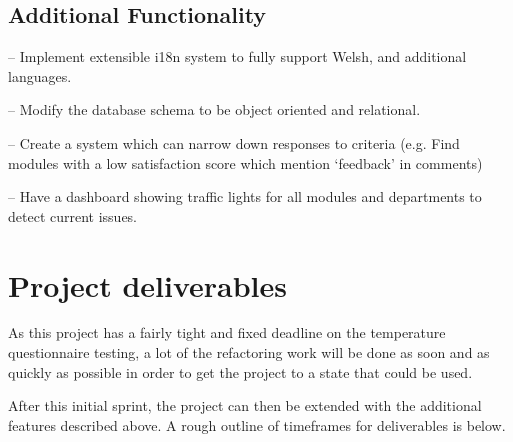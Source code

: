 \documentclass[11pt,fleqn,twoside]{article}
\begin{document}
\subsection{Additional Functionality}
\begin{description}[itemindent=-2em,leftmargin=4em]
	\item[Internationalisation (i18n)] -- Implement extensible i18n system to fully support Welsh, and additional languages.
	\item[Relational Database] -- Modify the database schema to be object oriented and relational.
	\item[Advanced Analytics] -- Create a system which can narrow down responses to criteria (e.g. Find modules with a low satisfaction score which mention `feedback' in comments)
	\item[Traffic Light Dashboard] -- Have a dashboard showing traffic lights for all modules and departments to detect current issues.
\end{description}


\section{Project deliverables}

As this project has a fairly tight and fixed deadline on the temperature questionnaire testing, a lot of the refactoring work will be done as soon and as quickly as possible in order to get the project to a state that could be used.

After this initial sprint, the project can then be extended with the additional features described above.
A rough outline of timeframes for deliverables is below.
\end{document}
